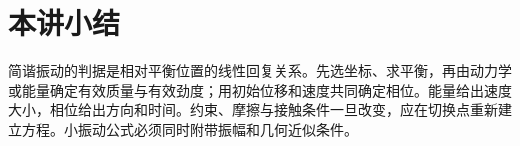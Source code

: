 \section{本讲小结}
简谐振动的判据是相对平衡位置的线性回复关系。先选坐标、求平衡，再由动力学或能量确定有效质量与有效劲度；用初始位移和速度共同确定相位。能量给出速度大小，相位给出方向和时间。约束、摩擦与接触条件一旦改变，应在切换点重新建立方程。小振动公式必须同时附带振幅和几何近似条件。
